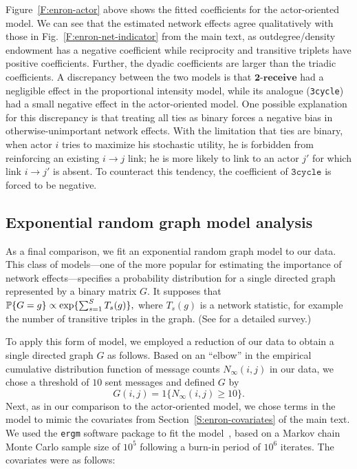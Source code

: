 \documentclass[final]{statsoc}
\begin{document}
Figure~\ref{F:enron-actor} above shows the fitted coefficients for the
actor-oriented model.  We can see that the estimated network effects agree
qualitatively with those in Fig.~\ref{F:enron-net-indicator} from the main text, as
outdegree/density endowment has a negative coefficient while reciprocity and
transitive triplets have positive coefficients.  Further, the dyadic
coefficients are larger than the triadic coefficients.  A discrepancy between
the two models is that $\textbf{2-receive}$ had a negligible effect in the
proportional intensity model, while its analogue (\texttt{3cycle}) had a small
negative effect in the actor-oriented model.  One possible explanation for
this discrepancy is that treating all ties as binary forces a negative bias in
otherwise-unimportant network effects.  With the limitation that ties are
binary, when actor $i$ tries to maximize his stochastic utility, he is
forbidden from reinforcing an existing $i \to j$ link; he is more
likely to link to an actor $j'$ for which link $i \to j'$ is absent.
To counteract this tendency, the coefficient of $\texttt{3cycle}$ is
forced to be negative.

\subsection{Exponential random graph model analysis}\label{S:ERGM}

As a final comparison, we fit an exponential random graph model to our data.  This class of models---one of the more popular for estimating the importance of network effects---specifies a probability
distribution for a single directed graph represented by a binary matrix $G$.
It supposes that
\(
  \mathbb{P}\{ G = g \} \propto \exp\{ \sum_{s=1}^S T_s(g) \},
\)
where $T_s(g)$ is a network statistic, for example the number of transitive
triples in the graph.  (See \cite{anderson1999pstar} for a detailed survey.)

To apply this form of model, we employed a reduction of our data to obtain
a single directed graph $G$ as follows.  Based on an ``elbow'' in the empirical cumulative distribution function of message counts $N_\infty(i,j)$ in our data, we chose a threshold of $10$ sent messages and defined $G$  by
\[
  G(i,j) = 1\{ N_\infty(i,j) \geq 10 \}.
\]
Next, as in our comparison to the actor-oriented model, we chose terms in the
model to mimic the covariates from Section~\ref{S:enron-covariates} of the main text.
We used the \texttt{ergm} software package to fit the
model~\citep{ergm2011}, based on a Markov chain Monte Carlo sample size of
$10^5$ following a burn-in period of $10^6$ iterates.  The covariates were as
follows:
\end{document}
